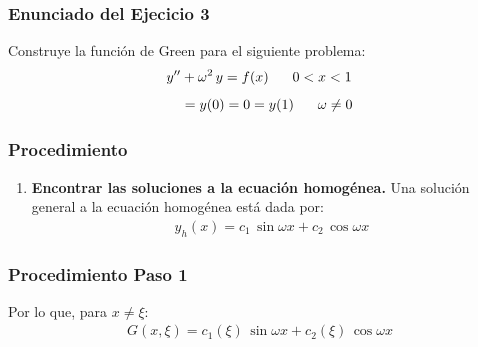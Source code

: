 \documentclass[12pt]{beamer}
\begin{document}
\begin{frame}
\frametitle{Enunciado del Ejecicio 3}
Construye la función de Green para el siguiente problema:
\pause
\begin{align*}
{y}^{\prime \prime} &+ \omega^{2} \, y = f(x) \hspace{0.6cm} 0 < x < 1 \\[0.5em]
&=y (0) = 0 = y (1) \hspace{0.6cm} \omega \neq 0
\end{align*}
\end{frame}
\begin{frame}
\frametitle{Procedimiento}
\begin{enumerate}[<+->]
\item \textbf{Encontrar las soluciones a la ecuación homogénea.}
\pause
Una solución general a la ecuación homogénea está dada por:
\pause
\begin{align*}
y_{h} (x) = c_{1} \, \sin \omega x + c_{2} \, \cos \omega x
\end{align*}
\seti
\end{enumerate}
\end{frame}
\begin{frame}
\frametitle{Procedimiento Paso 1}
Por lo que, para $x \neq \xi$:
\pause
\begin{align*}
G (x, \xi) = c_{1} (\xi) \, \sin \omega x + c_{2} (\xi) \, \cos \omega x
\end{align*}
\end{frame}
\end{document}
